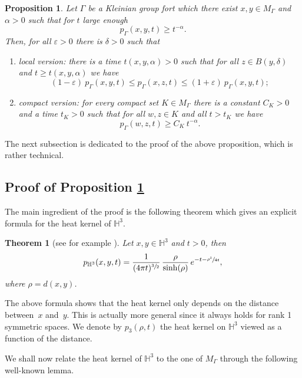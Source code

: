 \documentclass[10pt]{amsart}
\let\epsilon\varepsilon
\theoremstyle{plain}
\newtheorem{theoreme}[equation]{Theorem}
\newtheorem{proposition}[equation]{Proposition}
\theoremstyle{definition}
\newcommand{\HH}{\mathbb{H}}
\begin{document}
\begin{proposition}
\label{propheatkernellip}
Let $\Gamma$ be a Kleinian group fort which there exist $x,y \in M_{\Gamma}$ and $\alpha > 0$ such that for $t$ large enough
\[
p_{\Gamma}(x,y,t) \ge t^{-\alpha}.
\]
Then, for all $\epsilon > 0$ there is $\delta > 0$ such that
\begin{enumerate}
\item \emph{local version:} there is a time $t(x,y, \alpha) > 0$ such that for all $z \in B(y,\delta)$ and $t \ge t(x,y, \alpha)$ we have
\[
(1 - \epsilon) \ p_{\Gamma}(x,y,t) \le p_{\Gamma}(x,z,t) \le (1 + \epsilon) \ p_{\Gamma}(x,y,t) ;
\]
\item \emph{compact version:} for every compact set $K \in M_{\Gamma}$ there is a constant $C_K > 0$ and a time $t_K > 0$ such that for all $w,z \in K$ and all $t > t_K$ we have
\[
p_{\Gamma}(w,z,t) \ge C_K \ t^{-\alpha}.
\]
\end{enumerate}
\end{proposition}

The next subsection is dedicated to the proof of the above proposition, which is rather technical.

\subsection{Proof of Proposition \ref{propheatkernellip} } The main ingredient of the proof is the following theorem which gives an explicit formula for the heat kernel of $\HH^3$.

\begin{theoreme}[see for example \cite{artgrigoheatkernelhyper}]
\label{theogrigoformuleheatkernelhyp}
Let $x, y \in \HH^3$ and $t > 0$, then
\begin{equation}
\label{formuleniyauchaleur}
p_{\HH^3}(x,y,t) = \frac{1}{(4\pi t)^{\sfrac{3}{2}}}\, \frac{\rho}{\sinh(\rho)}\, e^{- t - \sfrac{\rho^2}{4t}},
\end{equation}
where $\rho = d(x,y)$.
\end{theoreme}

The above formula shows that the heat kernel only depends on the distance between~$x$ and~$y$. This is actually more general since it always holds for rank 1 symmetric spaces. We denote by $p_{3}(\rho,t)$ the heat kernel on $\HH^3$ viewed as a function of the distance.

We shall now relate the heat kernel of $\HH^3$ to the one of $M_{\Gamma}$ through the following well-known lemma.
\end{document}
